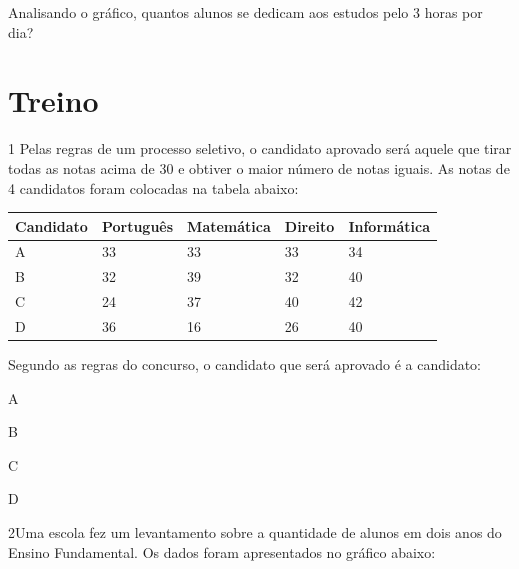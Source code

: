Analisando o gráfico, quantos alunos se dedicam aos estudos pelo 3 horas
por dia?


\pagebreak
\section{Treino}

\num{1} Pelas regras de um processo seletivo, o candidato aprovado
será aquele que tirar todas as notas acima de 30 e obtiver o
maior número de notas iguais. As notas de 4 candidatos foram colocadas
na tabela abaixo:

\begin{longtable}[]{@{}lllll@{}}
\toprule
Candidato & Português & Matemática & Direito &
Informática\tabularnewline
\midrule
\endhead
A & 33 & 33 & 33 & 34\tabularnewline
B & 32 & 39 & 32 & 40\tabularnewline
C & 24 & 37 & 40 & 42\tabularnewline
D & 36 & 16 & 26 & 40\tabularnewline
\bottomrule
\end{longtable}

Segundo as regras do concurso, o candidato que será aprovado é a
candidato:

\begin{minipage}{.5\textwidth}
\begin{escolha}
\item
  A
\item
  B
\item
  C
\item
  D
\end{escolha}
\end{minipage}

\pagebreak
\num{2}Uma escola fez um levantamento sobre a quantidade de alunos em dois
anos do Ensino Fundamental. Os dados foram apresentados no gráfico
abaixo:

